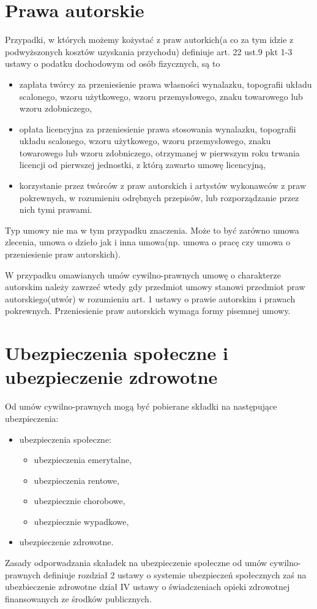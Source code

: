 \section[Prawa autorskie][Prawa autorskie]{Prawa autorskie}
\label{prawaAutorskie}
Przypadki, w których możemy kożystać z praw autorkich(a co za tym idzie z podwyższonych kosztów uzyskania przychodu) definiuje art. 22 ust.9 pkt 1-3 ustawy o podatku dochodowym od osób fizycznych\cite{TODO}, są to
\begin{itemize}
	\item  zapłata twórcy za przeniesienie prawa własności wynalazku, topografii układu scalonego, wzoru użytkowego, wzoru przemysłowego, znaku towarowego lub wzoru zdobniczego,
	\item opłata licencyjna za przeniesienie prawa stosowania wynalazku, topografii układu scalonego, wzoru użytkowego, wzoru przemysłowego, znaku towarowego lub wzoru zdobniczego, otrzymanej w pierwszym roku trwania licencji od pierwszej jednostki, z którą zawarto umowę licencyjną,
	\item korzystanie przez twórców z praw autorskich i artystów wykonawców z praw pokrewnych, w rozumieniu odrębnych przepisów, lub rozporządzanie przez nich tymi prawami.
\end{itemize}
Typ umowy nie ma w tym przypadku znaczenia. Może to być zarówno umowa zlecenia, umowa o dzieło jak i inna umowa(np. umowa o pracę czy umowa o przeniesienie praw autorskich).

W przypadku omawianych umów cywilno-prawnych umowę o charakterze autorskim należy zawrzeć wtedy gdy przedmiot umowy stanowi przedmiot praw autorskiego(utwór) w rozumieniu art. 1 ustawy o prawie autorskim i prawach pokrewnych\cite{TODO}. Przeniesienie praw autorskich wymaga formy pisemnej umowy.

\section[Ubezpieczenia społeczne i ubezpieczenie zdrowotne][Ubezpieczenia społeczne i ubezpieczenie zdrowotne]{Ubezpieczenia społeczne i ubezpieczenie zdrowotne}
Od umów cywilno-prawnych mogą być pobierane składki na następujące ubezpieczenia:
\begin{itemize}
	\item ubezpieczenia społeczne:
	\begin{itemize}
		\item ubezpieczenia emerytalne,
		\item ubezpieczenia rentowe,
		\item ubezpiecznie chorobowe,
		\item ubezpiecznie wypadkowe,
	\end{itemize}
	\item ubezpieczenie zdrowotne.
\end{itemize}
Zasady odporwadzania skaładek na ubezpieczenie społeczne od umów cywilno-prawnych definiuje rozdział 2 ustawy o systemie ubezpieczeń społecznych\cite{TODO} zaś na ubezbieczenie zdrowotne dział IV ustawy o świadczeniach opieki zdrowotnej finansowanych ze środków publicznych\cite{TODO}.

